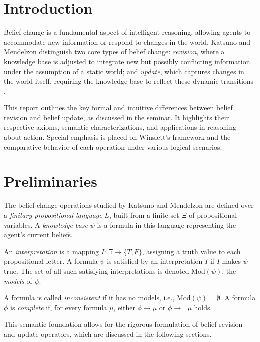 \documentclass[runningheads]{llncs}
\begin{document}
\section{Introduction}

Belief change is a fundamental aspect of intelligent reasoning, allowing agents to accommodate new information or respond to changes in the world. Katsuno and Mendelzon distinguish two core types of belief change: \emph{revision}, where a knowledge base is adjusted to integrate new but possibly conflicting information under the assumption of a static world; and \emph{update}, which captures changes in the world itself, requiring the knowledge base to reflect these dynamic transitions \cite{katsuno}.

This report outlines the key formal and intuitive differences between belief revision and belief update, as discussed in the seminar. It highlights their respective axioms, semantic characterizations, and applications in reasoning about action. Special emphasis is placed on Winslett’s framework and the comparative behavior of each operation under various logical scenarios.

\section{Preliminaries}

The belief change operations studied by Katsuno and Mendelzon are defined over a \emph{finitary propositional language} \( L \), built from a finite set \( \Xi \) of propositional variables. A \emph{knowledge base} \( \psi \) is a formula in this language representing the agent’s current beliefs.

An \emph{interpretation} is a mapping \( I: \Xi \rightarrow \{T, F\} \), assigning a truth value to each propositional letter. A formula \( \psi \) is satisfied by an interpretation \( I \) if \( I \) makes \( \psi \) true. The set of all such satisfying interpretations is denoted \( \text{Mod}(\psi) \), the \emph{models} of \( \psi \).

A formula is called \emph{inconsistent} if it has no models, i.e., \( \text{Mod}(\psi) = \emptyset \). A formula \( \phi \) is \emph{complete} if, for every formula \( \mu \), either \( \phi \rightarrow \mu \) or \( \phi \rightarrow \neg \mu \) holds.

This semantic foundation allows for the rigorous formulation of belief revision and update operators, which are discussed in the following sections.
\end{document}
